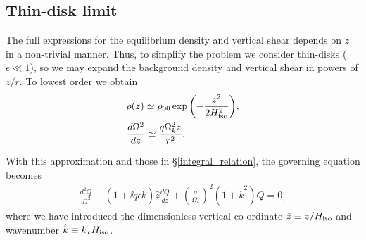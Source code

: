 

\subsection{Thin-disk limit}
The full expressions for the equilibrium density and vertical shear
depends on $z$ in a non-trivial manner. Thus, to simplify the problem 
we consider thin-disks ($\epsilon\ll1$), 
so we may expand the background density and vertical shear in powers
of $z/r$. To lowest order we obtain
\begin{align}
  &\rho(z) \simeq \rho_{00} \exp{\left(-\frac{z^2}{2H_\mathrm{iso}^2}\right)},\label{thin_dens}\\
  &\frac{d\Omega^2}{dz} \simeq \frac{q\Omega_k^2z}{r^2}. \label{thin_vshear}
\end{align}


With this approximation and those in \S\ref{integral_relation}, the
governing equation becomes
\begin{align}\label{iso_ode3}
  \frac{d^2Q}{d\hat{z}^2} - \left(1 + \ii q\epsilon
    \hat{k}\right)\hat{z}\frac{dQ}{d\hat{z}} +
  \left(\frac{\sigma}{\Omega_k}\right)^2\left(1+\hat{k}^2\right)Q = 
  0, 
\end{align}
where we have introduced the dimensionless vertical co-ordinate
$\hat{z} \equiv z/H_\mathrm{iso}$ and wavenumber $\hat{k} \equiv k_x H_\mathrm{iso}$. 

